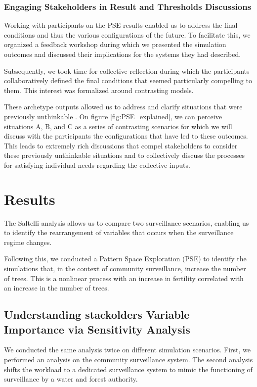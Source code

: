 \documentclass{article}
\begin{document}
    \subsubsection{Engaging Stakeholders in Result and Thresholds Discussions}

    Working with participants on the PSE results enabled us to address the final conditions and thus the various configurations of the future. To facilitate this, we organized a feedback workshop during which we presented the simulation outcomes and discussed their implications for the systems they had described.

    Subsequently, we took time for collective reflection during which the participants collaboratively defined the final conditions that seemed particularly compelling to them. This interest was formalized around contrasting models.

    These archetype outputs allowed us to address and clarify situations that were previously unthinkable \cite{banos_simulation_2010}. On figure \ref{fig:PSE_explained}, we can perceive situations A, B, and C as a series of contrasting scenarios for which we will discuss with the participants the configurations that have led to these outcomes. This leads to extremely rich discussions that compel stakeholders to consider these previously unthinkable situations and to collectively discuss the processes for satisfying individual needs regarding the collective inputs.


\section{Results}

The Saltelli analysis allows us to compare two surveillance scenarios, enabling us to identify the rearrangement of variables that occurs when the surveillance regime changes.

Following this, we conducted a Pattern Space Exploration (PSE) to identify the simulations that, in the context of community surveillance, increase the number of trees. This is a nonlinear process with an increase in fertility correlated with an increase in the number of trees.


    \subsection{Understanding stackolders Variable Importance via Sensitivity Analysis}

    We conducted the same analysis twice on different simulation scenarios. First, we performed an analysis on the community surveillance system. The second analysis shifts the workload to a dedicated surveillance system to mimic the functioning of surveillance by a water and forest authority.
\end{document}

